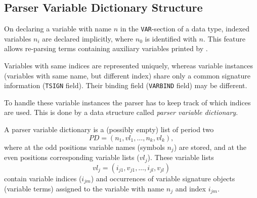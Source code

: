 \subsection{Parser Variable Dictionary Structure}
On declaring a variable with name $n$ in the {\tt VAR}-section of
a data type, indexed variables $n_i$ are declared implicitly, where
$n_0$ is identified with $n$.
This feature allows re-parsing terms containing auxiliary variables printed by
\redux.

Variables with same indices are represented uniquely, whereas variable
instances (variables with same name, but different index) share only a
common signature information ({\tt TSIGN} field). 
Their binding field ({\tt VARBIND} field) may be different.

To handle these variable instances the parser has to keep track of
which indices are used. This is done by a data structure called
{\em parser variable dictionary}.

A parser variable dictionary is a (possibly empty) list of period two
$$ PD = (n_1,vl_1,\dots,n_k,vl_k), $$
where at the odd positions
variable names (symbols $n_j$) are stored, and at the even positions
corresponding variable lists ($vl_j$). These variable lists
$$ vl_j = (i_{j1},v_{j1},\dots,i_{jl},v_{jl}) $$
contain variable indices ($i_{jm}$) and occurrences of variable signature
objects (variable terms) assigned to the variable with name $n_j$ 
and index $i_{jm}$.

